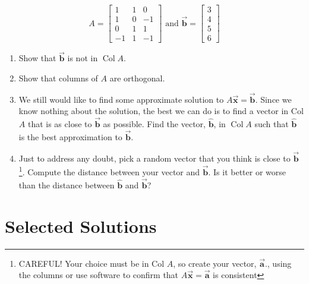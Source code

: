 \documentclass[letter,11pt]{article}
\theoremstyle{definition}
\begin{document}
$$ A=\begin{bmatrix}1 & 1 & 0 \\ 1 & 0 & -1 \\ 0 & 1 & 1 \\ -1 & 1 & -1 \end{bmatrix} \text { and } \vec{\boldsymbol{b}}=\begin{bmatrix} 3 \\ 4 \\ 5 \\ 6 \end{bmatrix} $$

\begin{enumerate}[label = \roman*.]
    \item Show that $\vec{\boldsymbol{b}}$ is not in $\operatorname{Col} A$.
    \item Show that columns of $A$ are orthogonal.
    \item We still would like to find some approximate solution to $A \vec{\boldsymbol{x}}=\vec{\boldsymbol{b}}$. Since we know nothing about the solution, the best we can do is to find a vector in Col $A$ that is as close to $\vec{\boldsymbol{b}}$ as possible. Find the vector, $\hat{\boldsymbol{b}}$, in $\operatorname{Col} A$ such that $\hat{\boldsymbol{b}}$ is the best approximation to $\vec{\boldsymbol{b}}$.
    \item Just to address any doubt, pick a random vector that you think is close to $\vec{\boldsymbol{b}}$\footnote[8]{CAREFUL! Your choice must be in Col $A$, so create your vector, $\vec{\boldsymbol{a}}$., using the columns or use software to confirm that $A \vec{\boldsymbol{x}}=\vec{\boldsymbol{a}}$ is consistent}. Compute the distance between your vector and $\vec{\boldsymbol{b}}$. Is it better or worse than the distance between $\hat{\boldsymbol{b}}$ and $\vec{\boldsymbol{b}}$?
    
\end{enumerate}
\newpage
\section{Selected Solutions}
\end{document}
